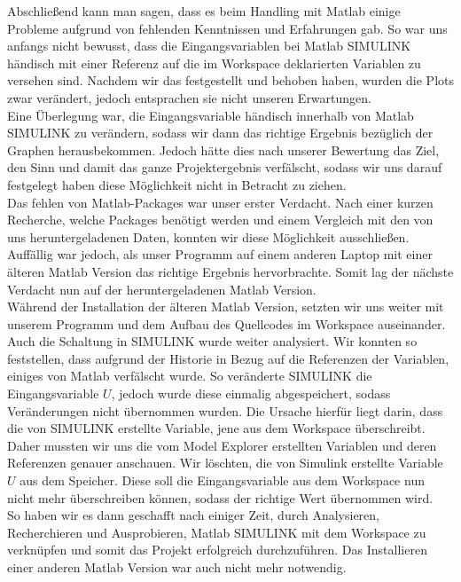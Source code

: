 \label{Fazit}

Abschließend kann man sagen, dass es beim Handling mit Matlab einige Probleme aufgrund von fehlenden Kenntnissen und Erfahrungen gab. So war uns anfangs nicht bewusst, dass die Eingangsvariablen bei Matlab SIMULINK händisch mit einer Referenz auf die im Workspace deklarierten Variablen zu versehen sind. Nachdem wir das festgestellt und behoben haben, wurden die Plots zwar verändert, jedoch entsprachen sie nicht unseren Erwartungen. \\
Eine Überlegung war, die Eingangsvariable händisch innerhalb von Matlab SIMULINK zu verändern, sodass wir dann das richtige Ergebnis bezüglich der Graphen herausbekommen. Jedoch hätte dies nach unserer Bewertung das Ziel, den Sinn und damit das ganze Projektergebnis verfälscht, sodass wir uns darauf festgelegt haben diese Möglichkeit nicht in Betracht zu ziehen. \\
Das fehlen von Matlab-Packages war unser erster Verdacht. Nach einer kurzen Recherche, welche Packages benötigt werden und einem Vergleich mit den von uns heruntergeladenen Daten, konnten wir diese Möglichkeit ausschließen. \\
Auffällig war jedoch, als unser Programm auf einem anderen Laptop mit einer älteren Matlab Version das richtige Ergebnis hervorbrachte. Somit lag der nächste Verdacht nun auf der heruntergeladenen Matlab Version. \\
Während der Installation der älteren Matlab Version, setzten wir uns weiter mit unserem Programm und dem Aufbau des Quellcodes im Workspace auseinander. Auch die Schaltung in SIMULINK wurde weiter analysiert. Wir konnten so feststellen, dass aufgrund der Historie in Bezug auf die Referenzen der Variablen, einiges von Matlab verfälscht wurde. So veränderte SIMULINK die Eingangsvariable $U$, jedoch wurde diese einmalig abgespeichert, sodass Veränderungen nicht übernommen wurden. Die Ursache hierfür liegt darin, dass die von SIMULINK erstellte Variable, jene aus dem Workspace überschreibt. \\
Daher mussten wir uns die vom Model Explorer erstellten Variablen und deren Referenzen genauer anschauen. Wir löschten, die von Simulink erstellte Variable $U$ aus dem Speicher. Diese soll die Eingangsvariable aus dem Workspace nun nicht mehr überschreiben können, sodass der richtige Wert übernommen wird. \\
So haben wir es dann geschafft nach einiger Zeit, durch Analysieren, Recherchieren und Ausprobieren, Matlab SIMULINK mit dem Workspace zu verknüpfen und somit das Projekt erfolgreich durchzuführen. Das Installieren einer anderen Matlab Version war auch nicht mehr notwendig. \\